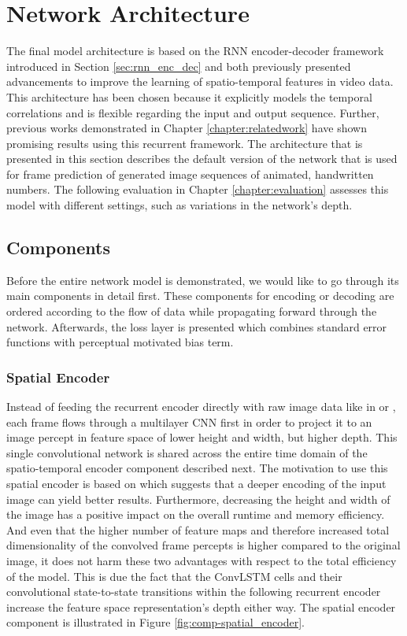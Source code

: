 \section{Network Architecture}

The final model architecture is based on the RNN encoder-decoder framework introduced in Section \ref{sec:rnn_enc_dec} and both previously presented advancements to improve the learning of spatio-temporal features in video data. This architecture has been chosen because it explicitly models the temporal correlations and is flexible regarding the input and output sequence. Further, previous works demonstrated in Chapter \ref{chapter:relatedwork} have shown promising results using this recurrent framework. The architecture that is presented in this section describes the default version of the network that is used for frame prediction of generated image sequences of animated, handwritten numbers. The following evaluation in Chapter \ref{chapter:evaluation} assesses this model with different settings, such as variations in the network's depth.

\subsection{Components}

Before the entire network model is demonstrated, we would like to go through its main components in detail first. These components for encoding or decoding are ordered according to the flow of data while propagating forward through the network. Afterwards, the loss layer is presented which combines standard error functions with perceptual motivated bias term.

\subsubsection{Spatial Encoder}

Instead of feeding the recurrent encoder directly with raw image data like in \parencite{unsup_learn_lstm} or \parencite{conv_lstm_nowcasting}, each frame flows through a multilayer CNN first in order to project it to an image percept in feature space of lower height and width, but higher depth. This single convolutional network is shared across the entire time domain of the spatio-temporal encoder component described next. The motivation to use this spatial encoder is based on \parencite{spat_temp_video_autoenc} which suggests that a deeper encoding of the input image can yield better results. Furthermore, decreasing the height and width of the image has a positive impact on the overall runtime and memory efficiency. And even that the higher number of feature maps and therefore increased total dimensionality of the convolved frame percepts is higher compared to the original image, it does not harm these two advantages with respect to the total efficiency of the model. This is due the fact that the ConvLSTM cells and their convolutional state-to-state transitions within the following recurrent encoder increase the feature space representation's depth either way. The spatial encoder component is illustrated in Figure \ref{fig:comp-spatial_encoder}.






